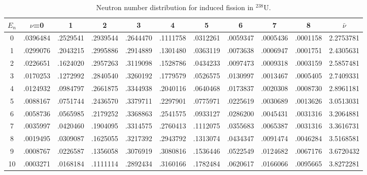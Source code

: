 \documentclass[11pt]{article}
\begin{document}
\begin{table}[ht]
\footnotesize
\begin{center}
\begin{tabular}{|c|ccccccccc|c|} \hline
$E_n$ & $\nu$=0 & 1 & 2 & 3 & 4 & 5 & 6 & 7 & 8 & $\bar{\nu}$ \\ \hline
0 & .0396484 & .2529541 & .2939544 & .2644470 & .1111758 & .0312261 & .0059347 & .0005436 & .0001158 & 2.2753781 \\
1 & .0299076 & .2043215 & .2995886 & .2914889 & .1301480 & .0363119 & .0073638 & .0006947 & .0001751 & 2.4305631 \\
2 & .0226651 & .1624020 & .2957263 & .3119098 & .1528786 & .0434233 & .0097473 & .0009318 & .0003159 & 2.5857481 \\
3 & .0170253 & .1272992 & .2840540 & .3260192 & .1779579 & .0526575 & .0130997 & .0013467 & .0005405 & 2.7409331 \\
4 & .0124932 & .0984797 & .2661875 & .3344938 & .2040116 & .0640468 & .0173837 & .0020308 & .0008730 & 2.8961181 \\
5 & .0088167 & .0751744 & .2436570 & .3379711 & .2297901 & .0775971 & .0225619 & .0030689 & .0013626 & 3.0513031 \\
6 & .0058736 & .0565985 & .2179252 & .3368863 & .2541575 & .0933127 & .0286200 & .0045431 & .0031316 & 3.2064881 \\
7 & .0035997 & .0420460 & .1904095 & .3314575 & .2760413 & .1112075 & .0355683 & .0065387 & .0031316 & 3.3616731 \\
8 & .0019495 & .0309087 & .1625055 & .3217392 & .2943792 & .1313074 & .0434347 & .0091474 & .0046284 & 3.5168581 \\
9 & .0008767 & .0226587 & .1356058 & .3076919 & .3080816 & .1536446 & .0522549 & .0124682 & .0067176 & 3.6720432 \\
10& .0003271 & .0168184 & .1111114 & .2892434 & .3160166 & .1782484 & .0620617 & .0166066 & .0095665 & 3.8272281 \\ \hline
\end{tabular}
\end{center}
\caption{Neutron number distribution for induced fission in $^{238}$U.}
\label{Neutron number distribution for induced fission in 238U}
\end{table}
\end{document}
